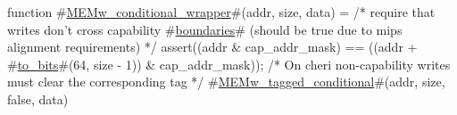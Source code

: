 function #\hyperref[zMEMwzyconditionalzywrapper]{MEMw\_conditional\_wrapper}#(addr, size, data) =
  {
    /* require that writes don't cross capability #\hyperref[zboundaries]{boundaries}# (should be true due to mips alignment requirements) */
    assert((addr & cap_addr_mask) == ((addr + #\hyperref[ztozybits]{to\_bits}#(64, size - 1)) & cap_addr_mask));
    /* On cheri non-capability writes must clear the corresponding tag */
    #\hyperref[zMEMwzytaggedzyconditional]{MEMw\_tagged\_conditional}#(addr, size, false, data)
  }
